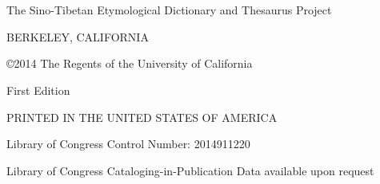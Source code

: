 \chapter*{}
\vspace{25em}
\thispagestyle{empty}
\begin{center}
The Sino-Tibetan Etymological Dictionary and Thesaurus Project

BERKELEY, CALIFORNIA

\copyright 2014 The Regents of the University of California

First Edition

PRINTED IN THE UNITED STATES OF AMERICA

Library of Congress Control Number:  2014911220

Library of Congress Cataloging-in-Publication Data available upon request

\vspace{10em}
\date{Compiled on \today\ at \currenttime}
\end{center}



